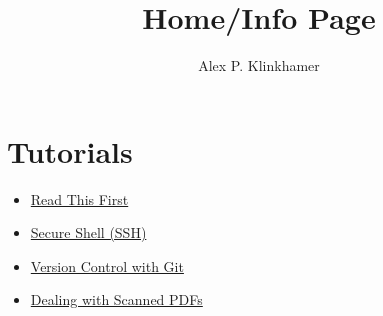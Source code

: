 
\title{Home/Info Page}
\author{Alex P. Klinkhamer}
\date{}



\section{Tutorials}
\begin{itemize}
\item \href{tut/prelim.html}{Read This First}
\item \href{tut/ssh.html}{Secure Shell (SSH)}
\item \href{tut/git.html}{Version Control with Git}
\item \href{tut/pdfscan.html}{Dealing with Scanned PDFs}
\end{itemize}



